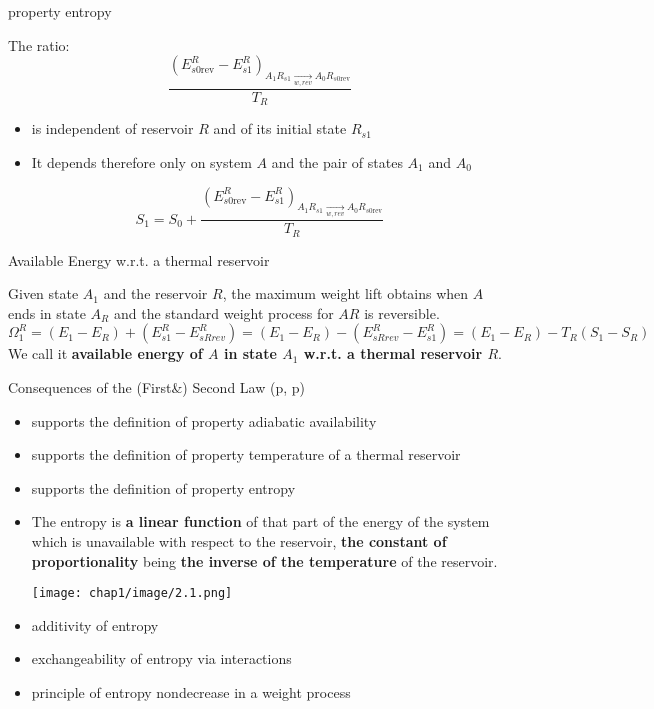 \begin{defn}
    property entropy
    
    The ratio:
\[
\frac{\left(E_{s0\text{rev}}^R - E_{s1}^R\right)_{A_1 R_{s1} \underset{w,rev}{\rightarrow} A_0 R_{s0\text{rev}}}}{T_R}
\]
\begin{itemize}
    \item is independent of reservoir \( R \) and of its initial state \( R_{s1} \)
    \item It depends therefore only on system \( A \) and the pair of states \( A_1 \) and \( A_0 \)
\end{itemize}
\[
S_1 = S_0 + \frac{\left(E_{s0\text{rev}}^R - E_{s1}^R\right)_{A_1 R_{s1} \underset{w,rev}{\rightarrow} A_0 R_{s0\text{rev}}}}{T_R}
\]
\end{defn}
\begin{defn}
    Available Energy w.r.t. a thermal reservoir

    Given state \( A_1 \) and the reservoir \( R \), 
    the maximum weight lift obtains when \( A \) ends 
    in state \( A_R \) and the standard weight process for \( AR \) is reversible.
    \[\Omega_1^R=(E_1-E_R)+(E^R_{s1}-E^R_{sRrev})
    =(E_1-E_R)-(E^R_{sRrev}-E^R_{s1})=(E_1-E_R)-T_R(S_1-S_R)\]
    We call it \textbf{available energy of \(A\) in state \(A_1\) w.r.t. a thermal reservoir \(R\)}.
\end{defn}
\begin{thm}\label{cfsl2}
    Consequences of the (First\&) Second Law (p\pageref{cfsl1}\;,\; p\pageref{cfsl3})
    \begin{itemize}
        \item supports the definition of property adiabatic availability
        \item supports the definition of property temperature of a thermal reservoir
        \item supports the definition of property entropy
        \item The entropy is \textbf{a linear function} of that part of the energy of the system which  
        is unavailable with respect to the reservoir, \textbf{the constant of proportionality} being \textbf{the  
        inverse of the temperature} of the reservoir.
        \begin{center}
            \texttt{[image: chap1/image/2.1.png]}
        \end{center}
        \item additivity of entropy 
        \item exchangeability of entropy via interactions
        \item principle of entropy non\textminus decrease in a weight process
    \end{itemize}
\end{thm}

